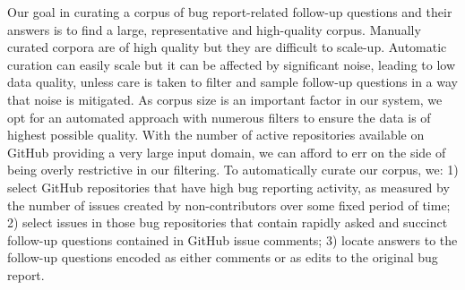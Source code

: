 Our goal in curating a corpus of bug report-related follow-up questions and their answers
is to find a large, representative and high-quality corpus. Manually curated corpora are of
high quality but they are difficult to scale-up. Automatic curation can easily scale but it
can be affected by significant noise, leading to low data quality, unless care is taken
to filter and sample follow-up questions in a way that noise is mitigated. As corpus size
is an important factor in our system, we opt for an automated approach with numerous filters
to ensure the data is of highest possible quality. With the number of active repositories available
on GitHub providing a very large input domain, we can afford to err on the side of being overly
restrictive in our filtering.
To automatically curate our corpus, we: 1) select GitHub repositories that have high bug reporting activity,
as measured by the number of issues created by non-contributors over some fixed period of time; 2) select issues in those bug repositories that contain rapidly asked and succinct follow-up questions contained in GitHub issue comments; 3) locate
answers to the follow-up questions encoded as either comments or as edits to the
original bug report.

